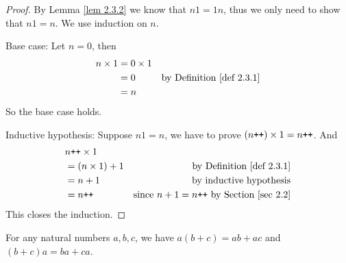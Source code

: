 \begin{proof}
By Lemma \ref{lem 2.3.2} we know that \(n1 = 1n\), thus we only need to show that \(n1 = n\).
We use induction on \(n\).

Base case: Let \(n=0\), then
\begin{align*}
    n \times 1 & = 0 \times 1 \\
           & = 0 & \text{by Definition \ref{def 2.3.1}} \\
           & = n
\end{align*}
So the base case holds.

Inductive hypothesis: Suppose \(n1 = n\), we have to prove \((n\texttt{++}) \times 1 = n\texttt{++}\). And
\begin{align*}
    & n\texttt{++} \times 1 \\
    & = (n \times 1) + 1 & \text{by Definition \ref{def 2.3.1}} \\
    & = n + 1 & \text{by inductive hypothesis} \\
    & = n\texttt{++} & \text{since \(n + 1 = n\texttt{++}\) by Section \ref{sec 2.2}}
\end{align*}
This closes the induction.
\end{proof}

\begin{proposition}\label{prop 2.3.4}
For any natural numbers \(a, b, c\), we have \(a(b + c)= ab + ac\) and \((b + c)a = ba + ca\).
\end{proposition}


